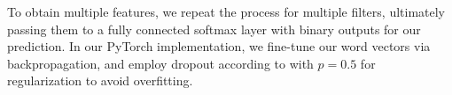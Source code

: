 \documentclass[11pt]{article}
\begin{document}
To obtain multiple features, we repeat the process for multiple filters, ultimately passing them to a fully connected softmax layer with binary outputs for our prediction. In our PyTorch implementation, we fine-tune our word vectors via backpropagation, and employ dropout according to \citet{DBLP:journals/corr/Kim14f} with $p = 0.5$ for regularization to avoid overfitting.






\end{document}
